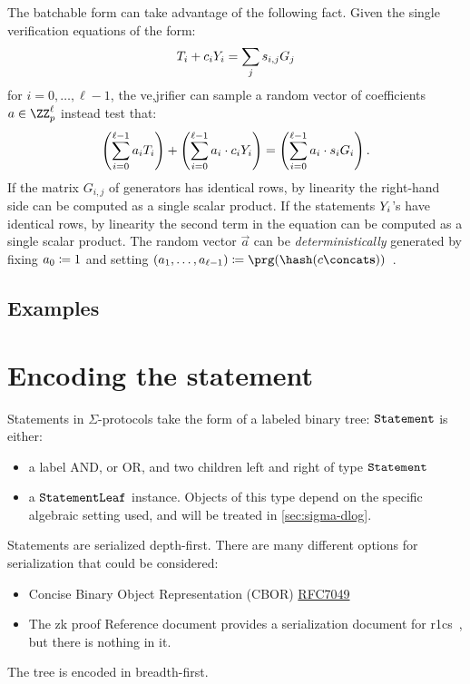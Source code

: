 \documentclass[11pt]{article}
\begin{document}
The batchable form can take advantage of the following fact.
Given the single verification equations of the form:
\[
   T_i + c_i Y_i = \sum_j s_{i, j} G_j
\]
for $i=0, \dots,\ell-1$,
the ve,jrifier can sample a random vector of coefficients $a \in \ZZ_p^\ell$ instead test that:
\[
  \left(\sum_{i=0}^{\ell-1} a_i T_i\right) + \left(\sum_{i=0}^{\ell-1} a_i \cdot  c_i Y_i \right) = \left(\sum_{i=0}^{\ell-1} a_i \cdot s_i G_i\right).
\]
If the matrix $G_{i, j}$ of generators has identical rows, by linearity the right-hand side can be computed as a single scalar product.
If the statements $Y_i$'s have identical rows, by linearity the second term in the equation can be computed as a single scalar product.
The random vector $\vec a$ can be \emph{deterministically} generated by fixing $a_0 \coloneqq 1$ and setting $(a_1, \dots, a_{\ell-1}) \defeq \prg(\hash(\challenge \concat \vec s))$~\cite{bip-schnorr}.


\subsection{Examples}



\section{Encoding the statement}

Statements in $\Sigma$-protocols take the form of a labeled binary tree:
$\texttt{Statement}$ is either:
\begin{itemize}
  \item a label \textsf{AND}, or \textsf{OR}, and two children \textsf{left} and \textsf{right} of type $\texttt{Statement}$
  \item a $\texttt{StatementLeaf}$ instance. Objects of this type depend on the specific algebraic setting used, and will be treated in \cref{sec:sigma-dlog}.
\end{itemize}
Statements are serialized depth-first.
  There are many different options for serialization that could be considered:
  \begin{itemize}
  \item Concise Binary Object Representation (CBOR) \href{https://datatracker.ietf.org/doc/html/rfc7049}{RFC7049}
    \item The zk proof Reference document provides a serialization document for r1cs~\cite[3.4.2]{zkproof-reference}, but there is nothing in it.
\end{itemize}
The tree is encoded in breadth-first.






\end{document}
